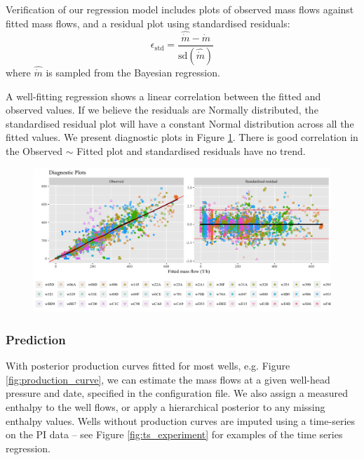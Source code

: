 \documentclass[a4paper, 12pt]{article}
\begin{document}
Verification of our regression model includes plots of observed mass flows against fitted mass flows, and a residual plot using standardised residuals:
\begin{equation}
\epsilon_\text{std} = \frac{\hat{\dot{m}} - \dot{m}}{\text{sd}\left( \hat{\dot{m}} \right)}
\end{equation}
where $\hat{\dot{m}}$ is sampled from the Bayesian regression.

A well-fitting regression shows a linear correlation between the fitted and observed values. If we believe the residuals are Normally distributed, the standardised residual plot will have a constant Normal distribution across all the fitted values. We present diagnostic plots in Figure \ref{fig:diagnostics}. There is good correlation in the Observed $\sim$ Fitted plot and standardised residuals have no trend. %

\begin{figure}
\centering
  \includegraphics[width=\linewidth]{media/diagnostics}
  \label{fig:diagnostics}
\end{figure}

\subsubsection{Prediction}
With posterior production curves fitted for most wells, e.g. Figure \ref{fig:production_curve}, we can estimate the mass flows at a given well-head pressure and date, specified in the configuration file. We also assign a measured enthalpy to the well flows, or apply a hierarchical posterior to any missing enthalpy values. Wells without production curves are imputed using a time-series on the PI data -- see Figure \ref{fig:ts_experiment} for examples of the time series regression.
\end{document}

